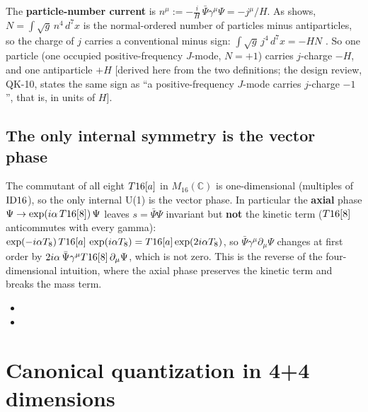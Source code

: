 The \textbf{particle-number current} is $n^\mu:=-\frac{i}{H}\,\bar\Psi\gamma^\mu\Psi=-j^\mu/H$.
As  shows, $N=\int\sqrt g\,n^4\,d^7x$ is the normal-ordered number of particles
minus antiparticles, so the charge of $j$ carries a conventional minus sign:
$\int\sqrt g\,j^4\,d^7x=-HN$ . So one particle (one occupied positive-frequency
$J$-mode, $N=+1$) carries $j$-charge $-H$, and one antiparticle $+H$ [derived here from the two
definitions; the design review, QK-10, states the same sign as ``a positive-frequency $J$-mode
carries $j$-charge $-1$'', that is, in units of $H$].

\subsection{The only internal symmetry is the vector phase}
\label{sec:5.11}

The commutant of all eight $T16[a]$ in $M_{16}(\mathbb C)$ is one-dimensional (multiples of
$\mathrm{ID16}$), so the only internal U(1) is the vector phase. In particular the \textbf{axial} phase
$\Psi\to\exp(i\alpha\,T16[8])\,\Psi$ leaves $s=\bar\Psi\Psi$ invariant but \textbf{not} the kinetic
term ($T16[8]$ anticommutes with every gamma):
$\exp(-i\alpha T_8)\,T16[a]\,\exp(i\alpha T_8)=T16[a]\exp(2i\alpha T_8)$, so
$\bar\Psi\gamma^\mu\partial_\mu\Psi$ changes at first order by
$2i\alpha\,\bar\Psi\gamma^\mu T16[8]\,\partial_\mu\Psi$, which is not zero. This is the reverse of
the four-dimensional intuition, where the axial phase preserves the kinetic term and breaks the mass
term. 
\begin{itemize}
  \item {}
  \item {}
\end{itemize}

\section{Canonical quantization in 4+4 dimensions}
\label{sec:6}

